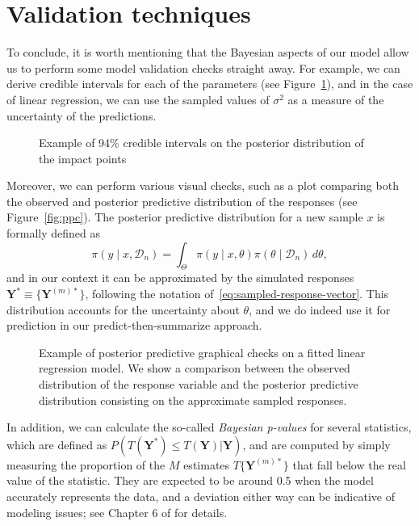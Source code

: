 \section{Validation techniques}

To conclude, it is worth mentioning that the Bayesian aspects of our model allow us to perform some model validation checks straight away. For example, we can derive credible intervals for each of the parameters (see Figure~\ref{fig:credible_intervals}), and in the case of linear regression, we can use the sampled values of \(\sigma^2\) as a measure of the uncertainty of the predictions.

\begin{figure}[ht!]
  \centering
    \setlength{\fboxrule}{.5pt}%
  \caption{Example of 94\% credible intervals on the posterior distribution of the impact points}\label{fig:credible_intervals}
\end{figure}


Moreover, we can perform various visual checks, such as a plot comparing both the observed and posterior predictive distribution of the responses (see Figure~\ref{fig:ppc}). The posterior predictive distribution for a new sample \(x\) is formally defined as
\[
\pi(y\mid x, \mathcal D_n) = \int_{\Theta} \pi(y\mid x, \theta)\pi(\theta\mid \mathcal D_n)\, d\theta,
\]
and in our context it can be approximated by the simulated responses \(\symbf Y^* \equiv \{\symbf Y^{(m)*}\}\), following the notation of~\eqref{eq:sampled-response-vector}. This distribution accounts for the uncertainty about \(\theta\), and we do indeed use it for prediction in our predict-then-summarize approach.

\begin{figure}[ht!]
  \centering
  \setlength{\fboxrule}{.5pt}%
  \caption{Example of posterior predictive graphical checks on a fitted linear regression model. We show a comparison between the observed distribution of the response variable and the posterior predictive distribution consisting on the approximate sampled responses.}\label{fig:ppc_linear}
\end{figure}


In addition, we can calculate the so-called \textit{Bayesian p-values} for several statistics, which are defined as \(P(T(\symbf Y^*)\leq T(\symbf Y)| \symbf Y)\), and are computed by simply measuring the proportion of the \(M\) estimates \(T\{\symbf Y^{(m)*}\}\) that fall below the real value of the statistic. They are expected to be around 0.5 when the model accurately represents the data, and a deviation either way can be indicative of modeling issues; see Chapter 6 of \citet{gelman2013bayesian} for details.
